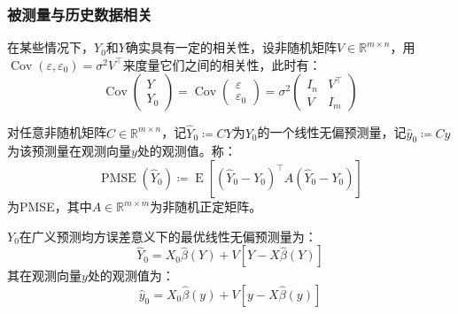 \subsubsection{被测量与历史数据相关}
\begin{derivation}
	在某些情况下，$Y_0$和$Y$确实具有一定的相关性，设非随机矩阵$V\in\mathbb{R}^{m\times n}$，用$\operatorname{Cov}(\varepsilon,\varepsilon_0)=\sigma^2V^{\top}$来度量它们之间的相关性，此时有：
	\begin{equation*}
		\operatorname{Cov}
		\begin{pmatrix}
			Y \\
			Y_0
		\end{pmatrix}
		=\operatorname{Cov}
		\begin{pmatrix}
			\varepsilon \\
			\varepsilon_0
		\end{pmatrix}
		=\sigma^2
		\begin{pmatrix}
			I_n & V^{\top} \\
			V & I_m 
		\end{pmatrix}
	\end{equation*}
\end{derivation}
\begin{definition}
	对任意非随机矩阵$C\in\mathbb{R}^{m\times n}$，记$\widehat{Y}_0\coloneq CY$为$Y_0$的一个线性无偏预测量，记$\hat{y}_0\coloneq Cy$为该预测量在观测向量$y$处的观测值。称：
	\begin{equation*}
		\operatorname{PMSE}(\widehat{Y}_0)\coloneq\operatorname{E}[(\widehat{Y}_0-Y_0)^{\top}A(\widehat{Y}_0-Y_0)]
	\end{equation*}
	为\gls{PMSE}，其中$A\in\mathbb{R}^{m\times m}$为非随机正定矩阵。
\end{definition}
\begin{theorem}\label{theo:PECorrelatedLinearModelForcast}
	$Y_0$在广义预测均方误差意义下的最优线性无偏预测量为：
	\begin{equation*}
		\widehat{Y}_0=X_0\hat{\beta}(Y)+V[Y-X\hat{\beta}(Y)]
	\end{equation*}
	其在观测向量$y$处的观测值为：
	\begin{equation*}
		\hat{y}_0=X_0\hat{\beta}(y)+V[y-X\hat{\beta}(y)]
	\end{equation*}
\end{theorem}
